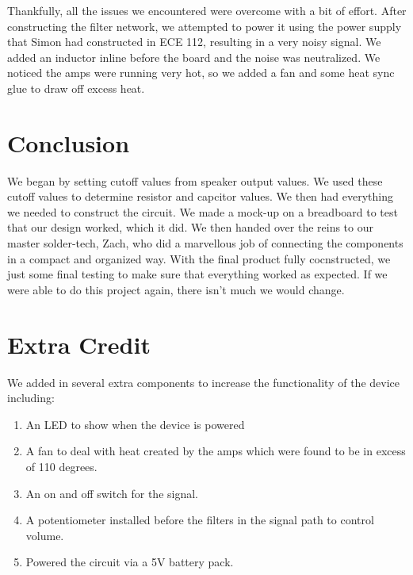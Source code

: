\documentclass{article}
\begin{document}
Thankfully, all the issues we encountered were overcome with a bit of effort. 
After constructing the filter network, we attempted to power it using the 
power supply that Simon had constructed in ECE 112, resulting in a very noisy 
signal. We added an inductor inline before the board and the noise was 
neutralized. We noticed the amps were running very hot, so we added a fan and 
some heat sync glue to draw off excess heat. 


\section*{Conclusion}
We began by setting cutoff values from speaker output values. We used these 
cutoff values to determine resistor and capcitor values. We then had 
everything we needed to construct the circuit. We made a mock-up on a 
breadboard to test that our design worked, which it did. We then handed 
over the reins to our master solder-tech, Zach, who did a marvellous 
job of connecting the components in a compact and organized way. With 
the final product fully cocnstructed, we just some final testing to 
make sure that everything worked as expected. If we were able to do this 
project again, there isn't much we would change. 

\section*{Extra Credit}
We added in several extra components to increase the functionality of the 
device including:
\begin{enumerate}
\item An LED to show when the device is powered
\item A fan to deal with heat created by the amps which were found to be in
 excess of 110 degrees.
\item An on and off switch for the signal. 
\item A potentiometer installed before the filters in the signal path to 
control volume.
\item Powered the circuit via a 5V battery pack.
\end{enumerate}
\end{document}
